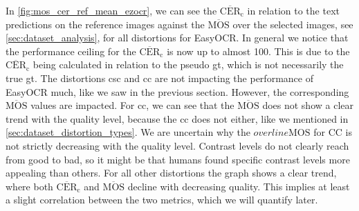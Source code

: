 In \autoref{fig:mos_cer_ref_mean_ezocr}, we can see the $\overline{\text{CER}}_{\text{c}}$ in relation to the text predictions on the reference images against the $\overline{\text{MOS}}$ over the selected images, see \autoref{sec:dataset_analysis}, for all distortions for EasyOCR.
In general we notice that the performance ceiling for the $\overline{\text{CER}}_{\text{c}}$ is now up to almost 100.
This is due to the $\overline{\text{CER}}_{\text{c}}$ being calculated in relation to the pseudo \gls{gt}, which is not necessarily the true \gls{gt}.
The distortions \gls{csc} and \gls{cc} are not impacting the performance of EasyOCR much, like we saw in the previous section.
However, the corresponding $\overline{\text{MOS}}$ values are impacted.
For \gls{cc}, we can see that the $\overline{\text{MOS}}$ does not show a clear trend with the quality level, because the \gls{cc} does not either, like we mentioned in \autoref{sec:dataset_distortion_types}.
We are uncertain why the $overline{\text{MOS}}$ for CC is not strictly decreasing with the quality level.
Contrast levels do not clearly reach from good to bad, so it might be that humans found specific contrast levels more appealing than others.
For all other distortions the graph shows a clear trend, where both $\overline{\text{CER}}_{\text{c}}$ and $\overline{\text{MOS}}$ decline with decreasing quality.
This implies at least a slight correlation between the two metrics, which we will quantify later.

